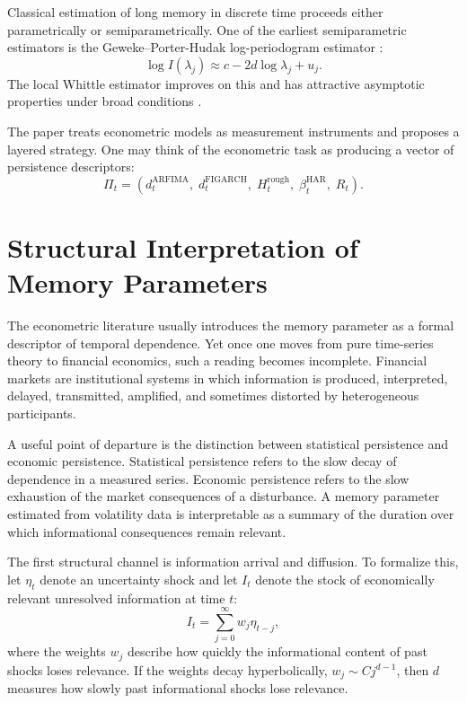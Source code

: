 \documentclass[12pt]{article}
\begin{document}
Classical estimation of long memory in discrete time proceeds either parametrically or semiparametrically. One of the earliest semiparametric estimators is the Geweke--Porter-Hudak log-periodogram estimator \citep{GewekerPorterHudak1983}:
\[
\log I(\lambda_j) \approx c - 2d \log \lambda_j + u_j.
\]
The local Whittle estimator improves on this and has attractive asymptotic properties under broad conditions \citep{Robinson1995}.

The paper treats econometric models as measurement instruments and proposes a layered strategy. One may think of the econometric task as producing a vector of persistence descriptors:
\[
\Pi_t = (d_t^{\mathrm{ARFIMA}},\; d_t^{\mathrm{FIGARCH}},\; H_t^{\mathrm{rough}},\; \beta_t^{\mathrm{HAR}},\; R_t).
\]

\section{Structural Interpretation of Memory Parameters}
\label{sec:structural}

The econometric literature usually introduces the memory parameter as a formal descriptor of temporal dependence. Yet once one moves from pure time-series theory to financial economics, such a reading becomes incomplete. Financial markets are institutional systems in which information is produced, interpreted, delayed, transmitted, amplified, and sometimes distorted by heterogeneous participants.

A useful point of departure is the distinction between statistical persistence and economic persistence. Statistical persistence refers to the slow decay of dependence in a measured series. Economic persistence refers to the slow exhaustion of the market consequences of a disturbance. A memory parameter estimated from volatility data is interpretable as a summary of the duration over which informational consequences remain relevant.

The first structural channel is information arrival and diffusion. To formalize this, let $\eta_t$ denote an uncertainty shock and let $I_t$ denote the stock of economically relevant unresolved information at time $t$:
\[
I_t = \sum_{j=0}^{\infty} w_j \eta_{t-j},
\]
where the weights $w_j$ describe how quickly the informational content of past shocks loses relevance. If the weights decay hyperbolically, $w_j \sim C j^{d-1}$, then $d$ measures how slowly past informational shocks lose relevance.
\end{document}
